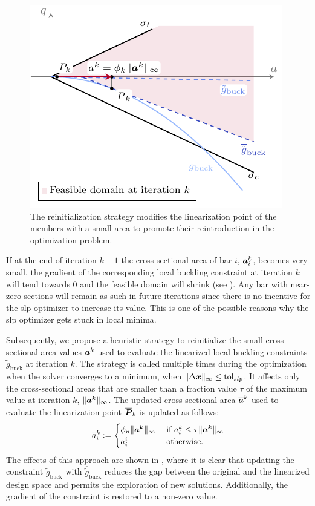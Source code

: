 \begin{figure}
    \centering
    \includegraphics[width=0.7\linewidth]{figures/04_TTO_improvements/05_reinit_strategy/reinit_strat.pdf}
    \caption{The reinitialization strategy modifies the linearization point of the members with a small area to promote their reintroduction in the optimization problem.}
    \label{fig:04_reinit_strat}
\end{figure}

If at the end of iteration $k-1$ the cross-sectional area of bar $i$, $\bm{a}^k_{i}$, becomes very small, the gradient of the corresponding local buckling constraint at iteration $k$ will tend towards 0 and the feasible domain will shrink (see ). Any bar with near-zero sections will remain as such in future iterations since there is no incentive for the \gls{slp} optimizer to increase its value. This is one of the possible reasons why the \gls{slp} optimizer gets stuck in local minima.

Subsequently, we propose a heuristic strategy to reinitialize the small cross-sectional area values $\bm{a}^{k}$ used to evaluate the linearized local buckling constraints $\tilde{g}_{\text{buck}}$ at iteration $k$. The strategy is called multiple times during the optimization when the solver converges to a minimum, \ie when $ \lVert\Delta \bm{x}\rVert_\infty \leq \text{tol}_{slp} $. It affects only the cross-sectional areas that are smaller than a fraction value $\tau$ of the maximum value at iteration $k$, $\lVert\bm{a^k}\rVert_\infty$. The updated cross-sectional area $\overline{\bm{a}}^k$ used to evaluate the linearization point $\overline{\bm{P}}_{k}$ is updated as follows:
\begin{equation}
    \overline{a}^k_{i}:=
    \begin{cases}
        \phi_n \lVert\bm{a^k}\rVert_\infty & \text{ if } a^k_{i} \leq \tau \lVert\bm{a^k}\rVert_\infty\\
        a^i_{i} & \text { otherwise.}  
    \end{cases}
    \label{eq:04_reinit}
\end{equation}
The effects of this approach are shown in , where it is clear that updating the constraint $\tilde{g}_{\text{buck}}$ with $\overline{\tilde{g}}_{\text{buck}}$ reduces the gap between the original and the linearized design space and permits the exploration of new solutions. Additionally, the gradient of the constraint is restored to a non-zero value.

